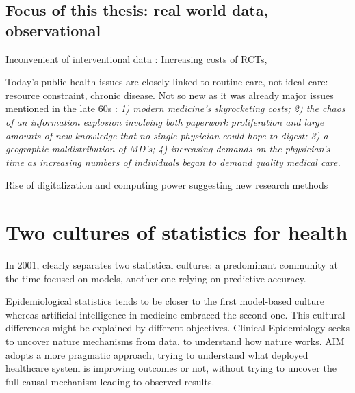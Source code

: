 \documentclass{report}
\begin{document}
\subsection{Focus of this thesis: real world data, observational}\label{subsec:intro:focus_data}

Inconvenient of interventional data : Increasing costs of RCTs,

Today's public health issues are closely linked to routine care, not ideal care:
resource constraint, chronic disease. Not so new as it was already major issues
mentioned in the late 60s \cite{rutstein1967coming}: \textit{1) modern
  medicine's skyrocketing costs; 2) the chaos of an information explosion
  involving both paperwork proliferation and large amounts of new knowledge that
  no single physician could hope to digest; 3) a geographic maldistribution of
  MD's; 4) increasing demands on the physician's time as increasing numbers of
  individuals began to demand quality medical care.}

Rise of digitalization and computing power suggesting new research methods

\section{Two cultures of statistics for health}\label{sec:intro:two_cultures}

In 2001, \cite{breiman2001statistical} clearly separates two statistical
cultures: a predominant community at the time focused on models, another one
relying on predictive accuracy.

Epidemiological statistics tends to be closer to the first model-based culture
whereas artificial intelligence in medicine embraced the second one. This
cultural differences might be explained by different objectives. Clinical
Epidemiology seeks to uncover nature mechanisms from data, to understand how
nature works. AIM adopts a more pragmatic approach, trying to understand what
deployed healthcare system is improving outcomes or not, without trying to
uncover the full causal mechanism leading to observed results.
\end{document}
